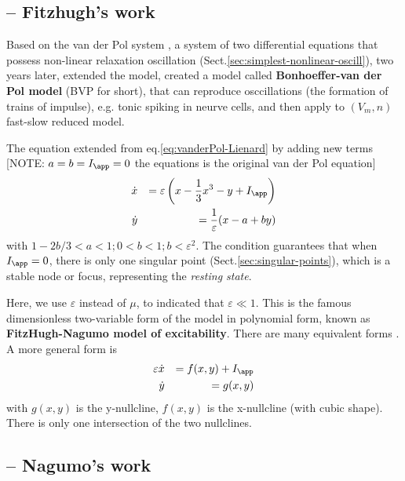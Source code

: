 \subsection{-- Fitzhugh's work}

Based on the van der Pol system \citep{vanderPol1926}, a system of two
differential equations that possess non-linear relaxation oscillation
(Sect.\ref{sec:simplest-nonlinear-oscill}), two years later,
\citep{fitzhugh1961ips} extended the model, created a model called {\bf
Bonhoeffer-van der Pol model} (BVP for short), that can reproduce osccillations
(the formation of trains of impulse), e.g. tonic spiking in neurve cells, and
then apply to $(V_m,n)$ fast-slow reduced model.

The equation extended from eq.\eqref{eq:vanderPol-Lienard} by adding new terms
[NOTE: $a=b=I_\app=0$ the equations is the original van der Pol equation]
\begin{eqnarray}
    \dot{x} &&= \varepsilon \left( x-\frac{1}{3}x^3 - y + I_\app \right) \\
    \dot{y} &&= \frac{1}{\varepsilon}(x -a + by)
\end{eqnarray}
with $1-2b/3 <a < 1; 0 < b< 1; b< \varepsilon^2$. The condition guarantees that
when $I_\app=0$, there is only one singular point
(Sect.\ref{sec:singular-points}), which is a stable node or focus, representing
the {\it resting state}.  

Here, we use $\varepsilon$ instead of $\mu$, to indicated that
$\varepsilon\ll1$.
This is the famous dimensionless two-variable form of the model in polynomial
form, known as {\bf FitzHugh-Nagumo model of excitability}.  There are many
equivalent forms \citep{rocsoreanu2000}. A more general form is
\begin{eqnarray}
\varepsilon\dot{x} &&= f(x,y) + I_\app \\
\dot{y} &&= g(x,y)
\end{eqnarray}
with $g(x,y)$ is the y-nullcline, $f(x,y)$ is the x-nullcline (with cubic
shape). There is only one intersection of the two nullclines. 


\subsection{-- Nagumo's work}
\label{sec:mathematical-model-4}


